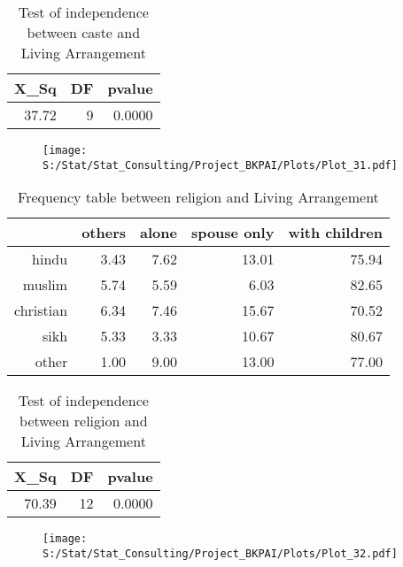 \documentclass[11pt]{article}
\begin{document}
\begin{table}[H]
\centering
\begin{tabular}{rrr}
  \hline
X\_Sq & DF & pvalue \\ 
  \hline
37.72 & 9 & 0.0000 \\ 
   \hline
\end{tabular}
\caption{Test of independence between caste and Living Arrangement} 
\end{table}
\begin{center}
\begin{figure}[H]
\texttt{[image: S:/Stat/Stat\_Consulting/Project\_BKPAI/Plots/Plot\_31.pdf]}

\end{figure}
\end{center}
\begin{table}[H]
\centering
\begin{tabular}{rrrrr}
  \hline
 & others & alone & spouse only & with children \\ 
  \hline
hindu & 3.43 & 7.62 & 13.01 & 75.94 \\ 
  muslim & 5.74 & 5.59 & 6.03 & 82.65 \\ 
  christian & 6.34 & 7.46 & 15.67 & 70.52 \\ 
  sikh & 5.33 & 3.33 & 10.67 & 80.67 \\ 
  other & 1.00 & 9.00 & 13.00 & 77.00 \\ 
   \hline
\end{tabular}
\caption{Frequency table between religion and Living Arrangement} 
\end{table}
\begin{table}[H]
\centering
\begin{tabular}{rrr}
  \hline
X\_Sq & DF & pvalue \\ 
  \hline
70.39 & 12 & 0.0000 \\ 
   \hline
\end{tabular}
\caption{Test of independence between religion and Living Arrangement} 
\end{table}
\begin{center}
\begin{figure}[H]
\texttt{[image: S:/Stat/Stat\_Consulting/Project\_BKPAI/Plots/Plot\_32.pdf]}

\end{figure}
\end{center}
\newpage
\end{document}
